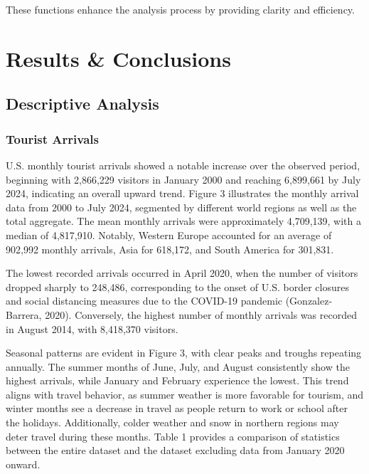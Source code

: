 \documentclass[11pt]{article}
\begin{document}
These functions enhance the analysis process by providing clarity and efficiency.

\section{Results \& Conclusions}

\subsection{Descriptive Analysis}

\subsubsection{Tourist Arrivals}

U.S. monthly tourist arrivals showed a notable increase over the observed period, beginning with 2,866,229 visitors in January 2000 and reaching 6,899,661 by July 2024, indicating an overall upward trend. Figure 3 illustrates the monthly arrival data from 2000 to July 2024, segmented by different world regions as well as the total aggregate. The mean monthly arrivals were approximately 4,709,139, with a median of 4,817,910. Notably, Western Europe accounted for an average of 902,992 monthly arrivals, Asia for 618,172, and South America for 301,831.

The lowest recorded arrivals occurred in April 2020, when the number of visitors dropped sharply to 248,486, corresponding to the onset of U.S. border closures and social distancing measures due to the COVID-19 pandemic (Gonzalez-Barrera, 2020). Conversely, the highest number of monthly arrivals was recorded in August 2014, with 8,418,370 visitors.

Seasonal patterns are evident in Figure 3, with clear peaks and troughs repeating annually. The summer months of June, July, and August consistently show the highest arrivals, while January and February experience the lowest. This trend aligns with travel behavior, as summer weather is more favorable for tourism, and winter months see a decrease in travel as people return to work or school after the holidays. Additionally, colder weather and snow in northern regions may deter travel during these months. Table 1 provides a comparison of statistics between the entire dataset and the dataset excluding data from January 2020 onward.
\end{document}
